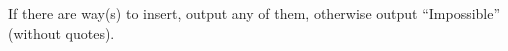  

 

If there are way(s) to insert, output any of them, otherwise output “Impossible” (without quotes).

 

 